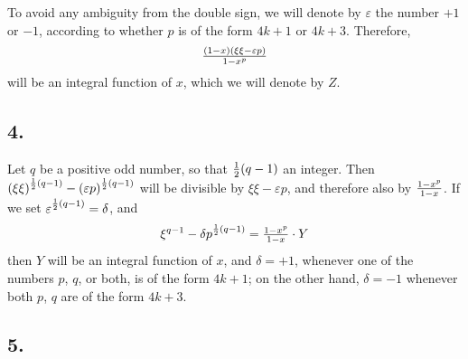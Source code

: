 \documentclass[twoside,12pt]{memoir}
\let\oldfrac\frac
\def\frac#1#2{\mathchoice{\tfrac{#1}{#2}}{\oldfrac{#1}{#2}}{\genfrac{}{}{}{2}{#1}{#2\mathstrut}}{\genfrac{}{}{}{3}{#1}{#2\mathstrut}}}
\begin{document}
To avoid any ambiguity from the double sign, we will denote by \(\varepsilon\) the number \(+1\) or \(-1\), according to whether \(p\) is of the form \(4k+1\) or \(4k+3\). Therefore,
\[\frac{(1-x)(\xi \xi-\varepsilon p)}{1-x^{p}}\]
will be an integral function of \(x\), which we will denote by \(Z\).

\subsection*{4.}

Let \(q\) be a positive odd number, so that \(\frac{1}{2}(q-1)\) an integer. Then \((\xi \xi)^{\frac{1}{2}(q-1)}-(\varepsilon p)^{\frac{1}{2}(q-1)}\) will be divisible by \(\xi \xi-\varepsilon p\), and therefore also by \(\frac{1-x^{p}}{1-x}\). If we set \(\varepsilon^{\frac{1}{2}(q-1)}=\delta\), and
\[\xi^{q-1}-\delta p^{\frac{1}{2}(q-1)}=\frac{1-x^{p}}{1-x} \cdot Y\]
then \(Y\) will be an integral function of \(x\), and \(\delta=+1\), whenever one of the numbers \(p\), \(q\), or both, is of the form \(4k+1\); on the other hand, \(\delta=-1\) whenever both \(p\), \(q\) are of the form \(4k+3\).

\subsection*{5.}
\end{document}
